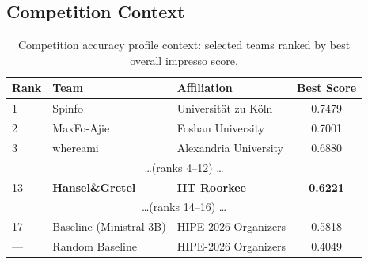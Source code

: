 \documentclass{ceurart}
\begin{document}
\subsection{Competition Context}

\begin{table}[ht]
  \caption{Competition accuracy profile context: selected teams ranked by best overall impresso score.}
  \label{tab:competition}
  \centering
  \begin{tabular}{lllc}
    \toprule
    \textbf{Rank} & \textbf{Team} & \textbf{Affiliation} & \textbf{Best Score} \\
    \midrule
    1  & Spinfo            & Universit\"at zu K\"oln          & 0.7479 \\
    2  & MaxFo-Ajie        & Foshan University                & 0.7001 \\
    3  & whereami          & Alexandria University            & 0.6880 \\
    \multicolumn{4}{c}{\ldots (ranks 4--12) \ldots} \\
    13 & \textbf{Hansel\&Gretel} & \textbf{IIT Roorkee} & \textbf{0.6221} \\
    \multicolumn{4}{c}{\ldots (ranks 14--16) \ldots} \\
    17 & Baseline (Ministral-3B) & HIPE-2026 Organizers & 0.5818 \\
    --- & Random Baseline  & HIPE-2026 Organizers             & 0.4049 \\
    \bottomrule
  \end{tabular}
\end{table}
\end{document}
